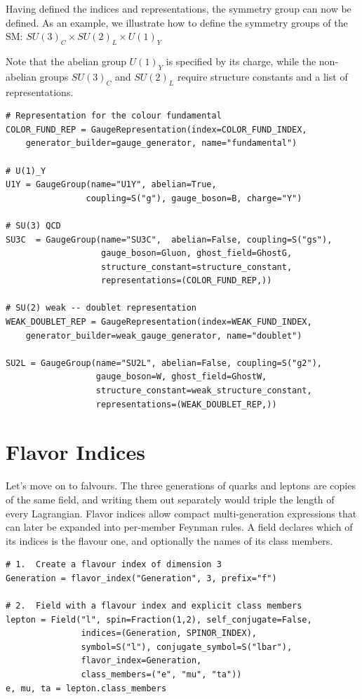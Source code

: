 Having defined the indices and representations, the symmetry group can now be defined. As an example, we illustrate how to define the symmetry groups of the SM: $SU(3)_C \times SU(2)_L \times U(1)_Y$

Note that the abelian group $U(1)_Y$ is specified by its charge, while the non-abelian groups $SU(3)_C$ and $SU(2)_L$ require structure constants and a list of representations.
\begin{verbatim}
# Representation for the colour fundamental
COLOR_FUND_REP = GaugeRepresentation(index=COLOR_FUND_INDEX,
    generator_builder=gauge_generator, name="fundamental")

# U(1)_Y
U1Y = GaugeGroup(name="U1Y", abelian=True,
                coupling=S("g"), gauge_boson=B, charge="Y")

# SU(3) QCD
SU3C  = GaugeGroup(name="SU3C",  abelian=False, coupling=S("gs"),
                   gauge_boson=Gluon, ghost_field=GhostG,
                   structure_constant=structure_constant,
                   representations=(COLOR_FUND_REP,))

# SU(2) weak -- doublet representation
WEAK_DOUBLET_REP = GaugeRepresentation(index=WEAK_FUND_INDEX,
    generator_builder=weak_gauge_generator, name="doublet")

SU2L = GaugeGroup(name="SU2L", abelian=False, coupling=S("g2"),
                  gauge_boson=W, ghost_field=GhostW,
                  structure_constant=weak_structure_constant,
                  representations=(WEAK_DOUBLET_REP,))
\end{verbatim}

\section{Flavor Indices}
\label{sec:feynpy-flavor}

Let's move on to falvours. The three generations of quarks and leptons are copies of the same field, and writing them out separately would triple the length of every Lagrangian.
Flavor indices allow compact multi-generation expressions that can later be expanded into per-member Feynman rules. A field declares which of its indices is the flavour one, and optionally the names of its class members.

\begin{verbatim}
# 1.  Create a flavour index of dimension 3
Generation = flavor_index("Generation", 3, prefix="f")

# 2.  Field with a flavour index and explicit class members
lepton = Field("l", spin=Fraction(1,2), self_conjugate=False,
               indices=(Generation, SPINOR_INDEX),
               symbol=S("l"), conjugate_symbol=S("lbar"),
               flavor_index=Generation,
               class_members=("e", "mu", "ta"))
e, mu, ta = lepton.class_members
\end{verbatim}

